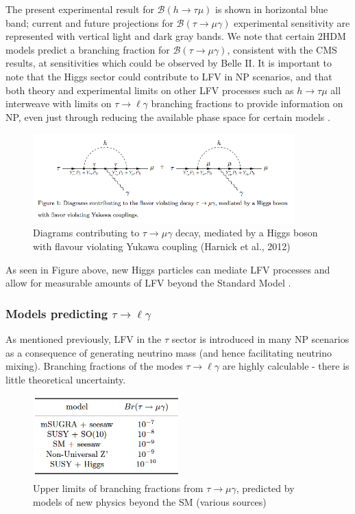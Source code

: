 \documentclass[12pt,a4paper]{article} %
\newcommand{\br}{\mathcal{B}}
\newcommand{\tmg}{\tau\to\mu\gamma}
\newcommand{\tlg}{\tau\to\ell\gamma}
\newcommand{\htm}{h\to \tau \mu}
\begin{document}
The present experimental result for $\br(\htm)$ is shown in horizontal blue band; current and future projections for $\br(\tmg)$ experimental sensitivity are represented with vertical light and dark gray bands. We note that certain 2HDM models predict a branching fraction for $\br(\tmg)$, consistent with the CMS results, at sensitivities which could be observed by Belle II. It is important to note that the Higgs sector could contribute to LFV in NP scenarios, and that both theory and experimental limits on other LFV processes such as $\htm$ all interweave with limits on $\tlg$ branching fractions to provide information on NP, even just through reducing the available phase space for certain models \cite{Dorsner:2015}.

\begin{figure}[h]
\centering
\includegraphics[width=0.9\textwidth]{images/higgs-lfv-modes.png}
\caption{Diagrams contributing to $\tmg$ decay, mediated by a Higgs boson with flavour violating Yukawa coupling (Harnick et al., 2012)}
\label{}
\end{figure}

As seen in Figure above, new Higgs particles can mediate LFV processes and allow for measurable amounts of LFV beyond the Standard Model \cite{Dorsner:2015}.


\subsubsection{Models predicting $\tlg$}

As mentioned previously, LFV in the $\tau$ sector is introduced in many NP scenarios as a consequence of generating neutrino mass (and hence facilitating neutrino mixing). Branching fractions of the modes $\tlg$ are highly calculable - there is little theoretical uncertainty.

\begin{figure}[h]
\centering
\includegraphics[width=0.5\textwidth]{images/np-models-bounds.png}
\caption{Upper limits of branching fractions from $\tmg$, predicted by models of new physics beyond the SM (various sources)\cite{Ohshima:2007zz}}
\label{}
\end{figure}
\end{document}
